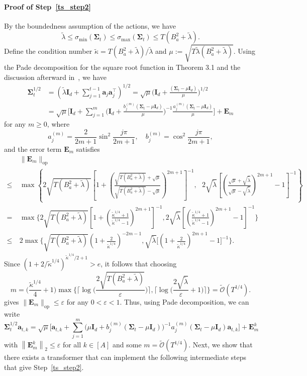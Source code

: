 \documentclass[10pt]{article}
\newcommand{\id}{\bI}
\newcommand{\eps}{\varepsilon}
\newcommand{\norm}[1]{\left\|{#1}\right\|}
\newcommand{\ltwo}[1]{\norm{#1}_2}
\newcommand{\lops}[1]{\|{#1}\|_{\mathrm{op}}}
\newcommand{\<}{\left\langle}
\renewcommand{\>}{\right\rangle}
\newcommand{\Tpscov}{{{\mathbf\Sigma}}}
\newcommand{\prodeig}{{\mu}}
\newcommand{\Errmat}{{\mathbf {E}}}
\newcommand{\padecond}{{\tilde \kappa}}
\newcommand{\tcO}{{\tilde{\mathcal O}}}
\def\bI{{\mathbf I}}
\def\ba{{\mathbf a}}
\begin{document}
\paragraph{Proof of Step~\ref{ts_step2}}
By the boundedness assumption of the actions, we have $$\tilde\lambda\leq\sigma_{\min}(\Tpscov_t)\leq\sigma_{\max}(\Tpscov_t)\leq T(B_a^2+\tilde\lambda).$$
Define the condition number $\padecond=T(B_a^2+\tilde\lambda)/\tilde\lambda$ and $\prodeig:=\sqrt{T\tilde\lambda(B_a^2+\tilde\lambda)}$.
Using the Pade decomposition for the  square root function in Theorem 3.1 and the discussion afterward in~\cite{lu1998pade}, we have
\begin{align*}
\Tpscov^{1/2}_t&=(\tilde\lambda\id_d+\sum_{j=1}^{t-1}\ba_j\ba_j^\top)^{1/2}=\sqrt{\prodeig}\Big(\id_d+\frac{(\Tpscov_t-\prodeig \id_d)}{\prodeig}\Big)^{1/2}\\
&=
\sqrt{\prodeig}\Big[\id_d+\sum_{j=1}^m \Big(\id_d+\frac{b_j^{(m)}(\Tpscov_t-\prodeig \id_d)}{\prodeig}\Big)^{-1}\frac{a_j^{(m)}(\Tpscov_t-\prodeig \id_d)}{\prodeig}\Big]+\Errmat_{m}
\end{align*}
for any $m\geq0$,
where
$$
a_j^{(m)}=\frac{2}{2 m+1} \sin ^2 \frac{j \pi}{2 m+1}, \quad b_j^{(m)}=\cos ^2 \frac{j \pi}{2 m+1},
$$ and the error term $\Errmat_m$ satisfies \begin{align*}
&~\lops{\Errmat_m}\\
\leq&~
\max \left\{2 \sqrt{{T(B_a^2+\tilde\lambda)}}\left[1+\left(\frac{\sqrt{T(B_a^2+\tilde\lambda)}+\sqrt{\mu}}{\sqrt{T(B_a^2+\tilde\lambda)}-\sqrt{\mu}}\right)^{2 m+1}\right]^{-1},~~~2 \sqrt{{\tilde\lambda}}\left[\left(\frac{\sqrt{\mu}+\sqrt{\tilde\lambda}}{\sqrt{\mu}-\sqrt{\tilde\lambda}}\right)^{2 m+1}-1\right]^{-1}\right\}
\\
=&~\max\Big\{2\sqrt{{T(B_a^2+\tilde\lambda)}}[1+(\frac{\padecond^{1/4}+1}{\padecond^{1/4}-1})^{2m+1}]^{-1},2\sqrt{\tilde\lambda}[(\frac{\padecond^{1/4}+1}{\padecond^{1/4}-1})^{2m+1}-1]^{-1}\Big\}\\
\leq&~2\max\Big\{\sqrt{{T(B_a^2+\tilde\lambda)}}(1+\frac{2}{\padecond^{1/4}})^{-2m-1},\sqrt{\tilde\lambda}\Big[(1+\frac{2}{\padecond^{1/4}})^{2m+1}- 1\Big]^{-1}\Big\}.
\end{align*}
Since $(1+2/\padecond^{1/4})^{\padecond^{1/4}/2+1}>e$, it follows that choosing $$
m= \Big(\frac{\padecond^{1/4}}{4}+1\Big)\max\Big\{\Big\lceil\log\Big(\frac{2\sqrt{T(B_a^2+\tilde\lambda)}}{\eps}\Big)\Big\rceil,\Big\lceil\log\Big(\frac{2\sqrt{\tilde\lambda}}{\eps}+1\Big)\Big\rceil\Big\}=\tcO(T^{1/4}).
$$ gives $\lops{\Errmat_m}\leq\eps$ for any $0<\eps<1$.
Thus, using Pade decomposition, we can write $$
\Tpscov_t^{1/2}\ba_{t,k}=\sqrt{\prodeig}\Big[\ba_{t,k}+\sum_{j=1}^m \Big({\prodeig}\id_d+{b_j^{(m)}(\Tpscov_t-\prodeig \id_d)}\Big)^{-1}{a_j^{(m)}(\Tpscov_t-\prodeig \id_d)\ba_{t,k}}\Big]+\Errmat_m^k$$ with $\ltwo{\Errmat_m^k}\leq\eps$ for all $k\in[A]$ and some $m=\tcO(T^{1/4})$. Next, we show that there exists a transformer that can implement the following intermediate steps that give Step~\ref{ts_step2}.
\end{document}

